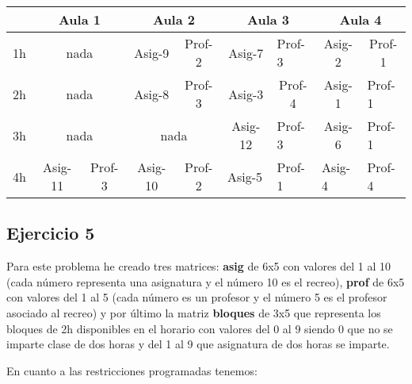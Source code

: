 \documentclass[a4paper,11pt]{article}
\begin{document}
\begin{table}[h]
\begin{tabular}{l|c|c|c|c|c|l|c|l|}
\cline{2-9}
                         & \multicolumn{2}{c|}{Aula 1} & \multicolumn{2}{c|}{Aula 2} & \multicolumn{2}{c|}{Aula 3}                               & \multicolumn{2}{c|}{Aula 4}                               \\ \hline
\multicolumn{1}{|l|}{1h} & \multicolumn{2}{c|}{nada}   & Asig-9        & Prof-2      & Asig-7                      & Prof-3                      & Asig-2                      & \multicolumn{1}{c|}{Prof-1} \\ \hline
\multicolumn{1}{|l|}{2h} & \multicolumn{2}{c|}{nada}   & Asig-8        & Prof-3      & Asig-3                      & \multicolumn{1}{c|}{Prof-4} & Asig-1                      & Prof-1                      \\ \hline
\multicolumn{1}{|l|}{3h} & \multicolumn{2}{c|}{nada}   & \multicolumn{2}{c|}{nada}   & Asig-12                     & Prof-3                      & Asig-6                      & Prof-1                      \\ \hline
\multicolumn{1}{|l|}{4h} & Asig-11       & Prof-3      & Asig-10       & Prof-2      & \multicolumn{1}{l|}{Asig-5} & Prof-1                      & \multicolumn{1}{l|}{Asig-4} & Prof-4                      \\ \hline
\end{tabular}
\end{table}

\subsection{Ejercicio 5}

Para este problema he creado tres matrices: \textbf{asig} de 6x5 con valores del 1 al 10 (cada número representa una asignatura y el número 10 es el recreo), \textbf{prof} de 6x5 con valores del 1 al 5 (cada número es un profesor y el número 5 es el profesor asociado al recreo) y por último la matriz \textbf{bloques} de 3x5 que representa los bloques de 2h disponibles en el horario con valores del 0 al 9 siendo 0 que no se imparte clase de dos horas y del 1 al 9 que asignatura de dos horas se imparte.

En cuanto a las restricciones programadas tenemos:
\end{document}
